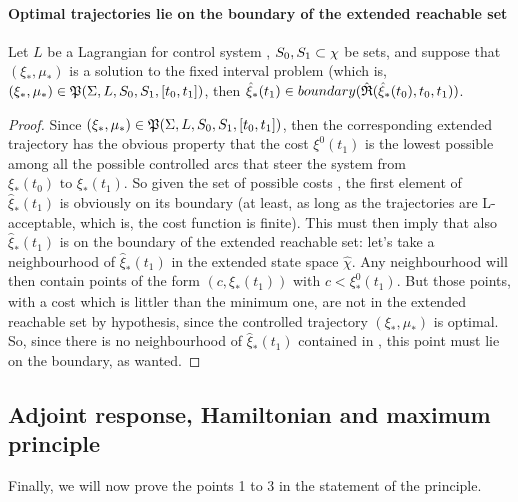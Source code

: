\paragraph[6.2]{Optimal trajectories lie on the boundary of the extended reachable set}
\begin{teo}
	Let $L$ be a Lagrangian for control system \controlSystem, $S_0,S_1\subset\chi$ be sets, and suppose that $(\xi_*,\mu_*)$ is a solution to the fixed interval problem (which is, $(\xi_*,\mu_*)\in\mathfrak{P}(\Sigma,L,S_0,S_1,[t_0,t_1])$, then $\hat{\xi}_*(t_1)\in boundary(\hat{\mathfrak{R}}(\hat\xi_*(t_0),t_0,t_1))$.
	\label{6-2}
	\label{T12}
\end{teo}
\begin{proof}
 Since $(\xi_*,\mu_*)\in\mathfrak{P}(\Sigma,L,S_0,S_1,[t_0,t_1])$, then the corresponding extended trajectory has the obvious property that the cost $\xi^0(t_1)$ is the lowest possible among all the possible controlled arcs \controlledTraj\space that steer the system from $\xi_*(t_0)\text{ to }\xi_*(t_1)$. So given the set of possible costs , the first element of $\hat{\xi}_*(t_1)$ is obviously on its boundary (at least, as long as the trajectories are L-acceptable, which is, the cost function is finite). This must then imply that also $\hat{\xi}_*(t_1)$ is on the boundary of the extended reachable set: let's take a neighbourhood of $\hat{\xi}_*(t_1)$ in the extended state space $\hat{\chi}$. Any neighbourhood will then contain points of the form $(c,\xi_*(t_1))$ with $c<\xi_*^0(t_1)$. But those points, with a cost which is littler than the minimum one, are not in the extended reachable set by hypothesis, since the controlled trajectory  $(\xi_*,\mu_*)$ is optimal. So, since there is no neighbourhood of $\hat{\xi}_*(t_1)$ contained in , this point must lie on the boundary, as wanted.
\end{proof}


\subsection[6.3]{Adjoint response, Hamiltonian and maximum principle}
Finally, we will now prove the points 1 to 3 in the statement of the principle. 


